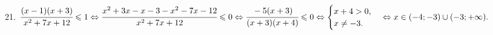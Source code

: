 21. $\cfrac{(x-1)(x+3)}{x^2+7x+12}\leqslant1\Leftrightarrow \cfrac{x^2+3x-x-3-x^2-7x-12}{x^2+7x+12}\leqslant0
\Leftrightarrow \cfrac{-5(x+3)}{(x+3)(x+4)}\leqslant0\Leftrightarrow \begin{cases} x+4>0,\\ x\neq-3.\end{cases}
\Leftrightarrow x\in(-4;-3)\cup(-3;+\infty).$\\
